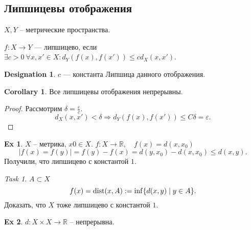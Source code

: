 \documentclass[11pt]{book}
\newcommand{\R}{\mathbb{R}}
\newcommand{\dist}{{\mathop{\text{\rm dist}}}}
\renewcommand{\le}{\leqslant}
\theoremstyle{definition}
\theoremstyle{plain}
\theoremstyle{plain}
\theoremstyle{definition}
\newtheorem*{ex}{Ex}
\newtheorem*{cor}{Corollary}
\newtheorem*{name}{Designation}
\theoremstyle{remark}
\newtheorem*{task}{Task}
\begin{document}
\subsection{Липшицевы отображения}
\begin{defn}
    $X, Y$ -- метрические пространства.

    $f: X \to  Y$ --- липшицево, если $\exists c > 0 ~\forall  x, x' \in  X: d_Y(f(x), f(x')) \le c d_X(x, x')$. 
    \begin{name}$c$ --- константа Липшица данного отображения.\end{name}
\end{defn}
\begin{cor}
    Все липшицевы отображения непрерывны.
\end{cor}
\begin{proof}
    Рассмотрим $ \delta = \frac{\varepsilon}{c}$.
    \[
	d_X(x, x') < \delta  \Rightarrow d_Y(f(x), f(x')) \le C \delta = \varepsilon
    .\]
\end{proof}
\begin{ex}
    $X $ -- метрика, $x0 \in  X$.
    $f: X \to  \R, \quad f(x) = d(x, x_0)$
    \[
	|f(x) = f(y)| = f(y) - f(x) = d(y, x_0) - d(x, x_0) \le d(x, y)
    .\]
    Получили, что липшицево с константой $1$.
\end{ex}
\begin{task}
    $A \subset  X$
    \[
	f(x) = \dist(x, A) := \inf \{d(x, y) \mid y \in  A\}
    .\]
    Доказать, что $X$ тоже липшицево с константой $1$.
\end{task}
\begin{ex}
    $d : X \times X \to  \R$ -- непрерывна.
\end{ex}
\end{document}
